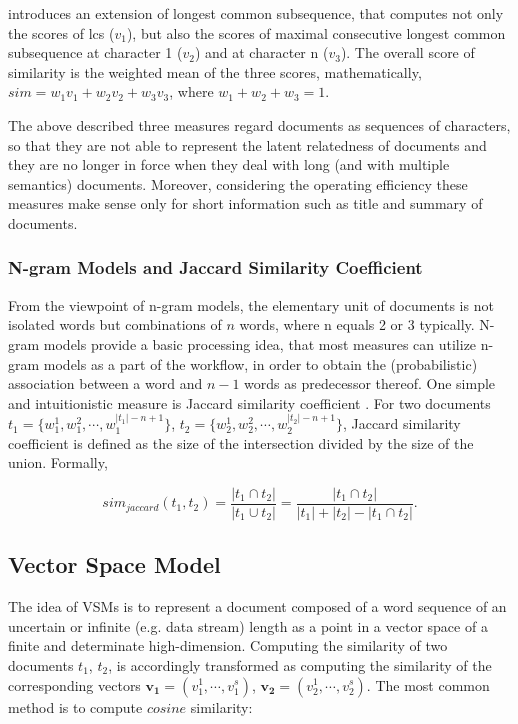 \cite{islam2008semantic} introduces an extension of longest common subsequence, that computes not only the scores of lcs ($v_1$), but also the scores of maximal consecutive longest common subsequence at character 1 ($v_2$) and at character n ($v_3$). The overall score of similarity is the weighted mean of the three scores, mathematically, $sim = w_1v_1 + w_2v_2 + w_3v_3$, where $w_1 + w_2 + w_3 = 1$. 

The above described three measures regard documents as sequences of characters, so that they are not able to represent the latent relatedness of documents and they are no longer in force when they deal with long (and with multiple semantics) documents. Moreover, considering the operating efficiency these measures make sense only for short information such as title and summary of documents. 


\subsubsection{N-gram Models and Jaccard Similarity Coefficient}

From the viewpoint of n-gram models, the elementary unit of documents is not isolated words but combinations of $n$ words, where n equals 2 or 3 typically. N-gram models provide a basic processing idea, that most measures can utilize n-gram models as a part of the workflow, in order to obtain the (probabilistic) association between a word and $n-1$ words as predecessor thereof. One simple and intuitionistic measure is Jaccard similarity coefficient \cite{bank2008calculating}. For two documents $t_1=\{w^1_1, w^2_1, \cdots, w^{|t_1|-n+1}_1\}$, $t_2=\{w^1_2, w^2_2, \cdots, w^{|t_2|-n+1}_2\}$, Jaccard similarity coefficient is defined as the size of the intersection divided by the size of the union. Formally,

\begin{equation}
    sim_{jaccard}(t_1, t_2) = \frac{|t_1 \cap t_2|}{|t_1 \cup t_2|} = \frac{|t_1 \cap t_2|}{|t_1| + |t_2| - |t_1 \cap t_2|}. 
\end{equation}


\subsection{Vector Space Model}
\label{sec:2.2}

The idea of VSMs is to represent a document composed of a word sequence of an uncertain or infinite (e.g. data stream) length as a point in a vector space of a finite and determinate high-dimension. Computing the similarity of two documents $t_1$, $t_2$, is accordingly transformed as computing the similarity of the corresponding vectors $\mathbf{v_1}=(v_1^1, \cdots, v_1^s)$, $\mathbf{v_2}=(v_2^1, \cdots, v_2^s)$. The most common method is to compute $cosine$ similarity:

